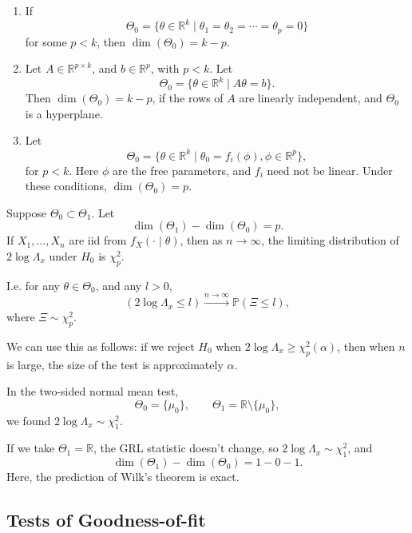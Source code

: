 \documentclass[12pt]{article}
\begin{document}
\begin{exbox}
	\begin{enumerate}
		\item If 
		\[
			\Theta_0 = \{ \theta \in \mathbb{R}^{k} \mid \theta_1 = \theta_2 = \cdots = \theta_p = 0\}
		\]
		for some $p < k$, then $\dim(\Theta_0) = k - p$.
	\item Let $A \in \mathbb{R}^{p\times k}$, and $b \in \mathbb{R}^{p}$, with $p < k$. Let
		\[
			\Theta_0 = \{\theta \in \mathbb{R}^{k} \mid A \theta = b\}.
		\]
		Then $\dim(\Theta_0) = k - p$, if the rows of $A$ are linearly independent, and $\Theta_0$ is a hyperplane.
	\item Let 
		\[
			\Theta_0 = \{\theta \in \mathbb{R}^{k} \mid \theta_0 = f_i(\phi), \phi \in \mathbb{R}^{p}\},
		\]
		for $p < k$. Here $\phi$ are the free parameters, and $f_i$ need not be linear. Under these conditions, $\dim(\Theta_0) = p$.
	\end{enumerate}
\end{exbox}

\begin{theorem}
	Suppose $\Theta_0 \subset \Theta_1$. Let
	\[
	\dim (\Theta_1) - \dim(\Theta_0) = p.
	\]
	If $X_1, \ldots, X_n$ are iid from $f_X(\cdot \mid \theta)$, then as $n \to \infty$, the limiting distribution of $2 \log \Lambda_x$ under $H_0$ is $\chi_p^2$.

	I.e. for any $\theta \in \Theta_0$, and any $l > 0$,
	\[
		(2 \log \Lambda_x \leq l) \overset{n \to \infty}{\to} \mathbb{P}(\Xi \leq l),
	\]
	where $\Xi \sim \chi_p^2$.
\end{theorem}
We can use this as follows: if we reject $H_0$ when $2 \log \Lambda_x \geq \chi_p^2(\alpha)$, then when $n$ is large, the size of the test is approximately $\alpha$.

\begin{exbox}
	In the two-sided normal mean test,
	\[
		\Theta_0 = \{\mu_0\}, \qquad \Theta_1 = \mathbb{R} \setminus \{\mu_0\},
	\]
	we found $2 \log \Lambda_x \sim \chi_1^2$.
	
	If we take $\Theta_1 = \mathbb{R}$, the GRL statistic doesn't change, so $2 \log \Lambda_x \sim \chi_1^2$, and
	\[
	\dim(\Theta_1) - \dim(\Theta_0) = 1 - 0 - 1.
	\]
	Here, the prediction of Wilk's theorem is exact.
\end{exbox}

\subsection{Tests of Goodness-of-fit}
\label{sub:tests_of_goodness_of_fit}
\end{document}
